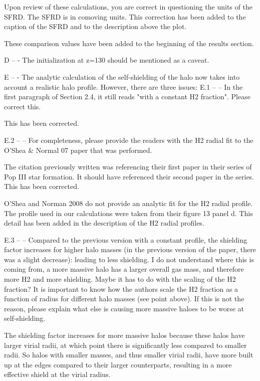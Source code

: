 \documentclass[11pt]{article}
\newenvironment{referee}[1][]{%
    \ignorespaces%
    \begin{mdframed}[style=myquotestyle,#1]%
}{%
    \end{mdframed}%
    \ignorespacesafterend%
}%
\begin{document}
    Upon review of these calculations, you are correct in questioning the units of the SFRD. The SFRD is in comoving units. This correction has been added to the caption of the SFRD and to the description above the plot. 

    These comparison values have been added to the beginning of the results section.

\begin{referee}
    D -- - The initialization at z=130 should be mentioned as a caveat. 
\end{referee}
    
\begin{referee}
    E -- - The analytic calculation of the self-shielding of the halo now takes into account a realistic halo profile. However, there are three issues: 
    E.1 -- -- In the first paragraph of Section 2.4, it still reads "with a constant H2 fraction". Please correct this. 
\end{referee}
    This has been corrected.

\begin{referee}
    E.2 -- -- For completeness, please provide the readers with the H2 radial fit to the O'Shea & Normal 07 paper that was performed. 
\end{referee}
    The citation previously written was referencing their first paper in their series of Pop III star formation. It should have referenced their second paper in the series. This has been corrected.
    
    O'Shea and Norman 2008 do not provide an analytic fit for the H2 radial profile. The profile used in our calculations were taken from their figure 13 panel d. This detail has been added in the description of the H2 radial profiles.


\begin{referee}
    E.3 -- -- Compared to the previous version with a constant profile, the shielding factor increases for higher halo masses (in the previous version of the paper, there was a slight decrease): leading to less shielding. I do not understand where this is coming from, a more massive halo has a larger overall gas mass, and therefore more H2 and more shielding. Maybe it has to do with the scaling of the H2 fraction?  It is important to know how the authors scale the H2 fraction as a function of radius for different halo masses (see point above). If this is not the reason, please explain what else is causing more massive haloes to be worse at self-shielding.  
\end{referee}
    The shielding factor increases for more massive halos because these halos have larger virial radii, at which point there is significantly less \hh{} compared to smaller radii. So halos with smaller masses, and thus smaller virial radii, have more \hh{} built up at the edges compared to their larger counterparts, resulting in a more effective shield at the virial radius.
\end{document}
